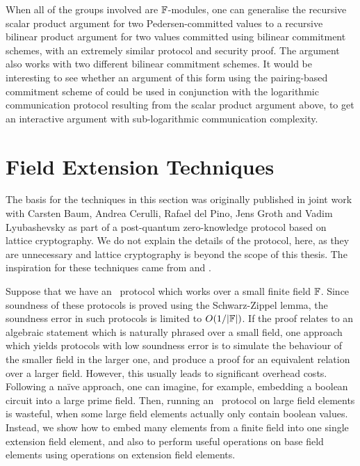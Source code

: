 When all of the groups involved are $\mathbb{F}$-modules, one can generalise the recursive scalar product argument for two Pedersen-committed values to a recursive bilinear product argument for two values committed using bilinear commitment schemes, with an extremely similar protocol and security proof. The argument also works with two different bilinear commitment schemes. It would be interesting to see whether an argument of this form using the pairing-based commitment scheme of \cite{Groth11} could be used in conjunction with the logarithmic communication protocol resulting from the scalar product argument above, to get an interactive argument with sub-logarithmic communication complexity.

\section{Field Extension Techniques}\label{sec:fieldext}

The basis for the techniques in this section was originally published in joint work \cite{BootleCCGP16} with Carsten Baum, Andrea Cerulli, Rafael del Pino, Jens Groth and Vadim Lyubashevsky as part of a post-quantum zero-knowledge protocol based on lattice cryptography. We do not explain the details of the protocol, here, as they are unnecessary and lattice cryptography is beyond the scope of this thesis. The inspiration for these techniques came from \cite{CramerDK14} and \cite{CramerDP12}.

Suppose that we have an \ILC\ protocol which works over a small finite field $\mathbb{F}$. Since soundness of these protocols is proved using the Schwarz-Zippel lemma, the soundness error in such protocols is limited to $O(1 / |\mathbb{F}|)$. If the proof relates to an algebraic statement which is naturally phrased over a small field, one approach which yields protocols with low soundness error is to simulate the behaviour of the smaller field in the larger one, and produce a proof for an equivalent relation over a larger field. However, this usually leads to significant overhead costs. Following a na\"{i}ve approach, one can imagine, for example, embedding a boolean circuit into a large prime field. Then, running an \ILC\ protocol on large field elements is wasteful, when some large field elements actually only contain boolean values. Instead, we show how to embed many elements from a finite field into one single extension field element, and also to perform useful operations on base field elements using operations on extension field elements.

